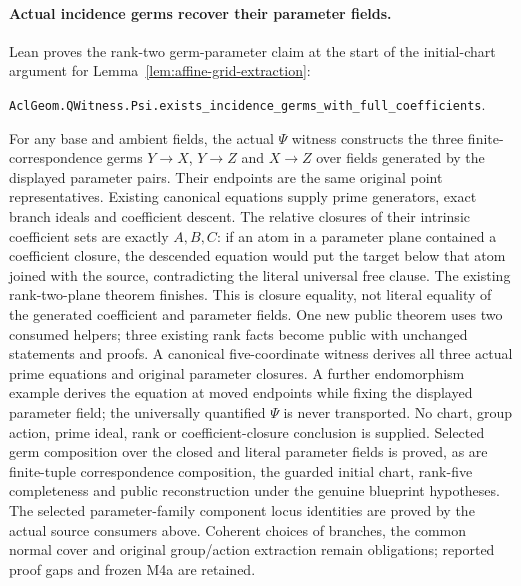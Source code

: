 \documentclass[11pt,oneside]{article}
\theoremstyle{definition}
\theoremstyle{remark}
\begin{document}
\paragraph{Actual incidence germs recover their parameter fields.}
Lean proves the rank-two germ-parameter claim at the start of the
initial-chart argument for Lemma~\ref{lem:affine-grid-extraction}:
\par\noindent
\texttt{AclGeom.QWitness.Psi.exists\_incidence\_germs\_with\_full\_coefficients}.
\par\noindent
For any base and ambient fields, the actual $\Psi$ witness constructs
the three finite-correspondence germs $Y\to X$, $Y\to Z$ and $X\to Z$
over fields generated by the displayed parameter pairs. Their endpoints
are the same original point representatives. Existing canonical
equations supply prime generators, exact branch ideals and coefficient
descent. The relative closures of their intrinsic coefficient sets are
exactly $A,B,C$: if an atom in a parameter plane contained a coefficient
closure, the descended equation would put the target below that atom
joined with the source, contradicting the literal universal free clause.
The existing rank-two-plane theorem finishes. This is closure equality,
not literal equality of the generated coefficient and parameter fields.
One new public theorem uses two consumed helpers; three existing rank
facts become public with unchanged statements and proofs. A canonical
five-coordinate witness derives all three actual prime equations and
original parameter closures. A further endomorphism example derives
the equation at moved endpoints while fixing the displayed parameter
field; the universally quantified $\Psi$ is never transported.
No chart, group action, prime ideal, rank or coefficient-closure
conclusion is supplied. Selected germ composition over the closed and literal
parameter fields is proved, as are finite-tuple correspondence composition,
the guarded initial chart, rank-five completeness and public reconstruction
under the genuine blueprint hypotheses. The selected parameter-family component
locus identities are proved by the actual source consumers above. Coherent choices
of branches, the common normal cover and original group/action extraction remain
obligations; reported proof gaps and frozen M4a are retained.

\clearpage
\end{document}
